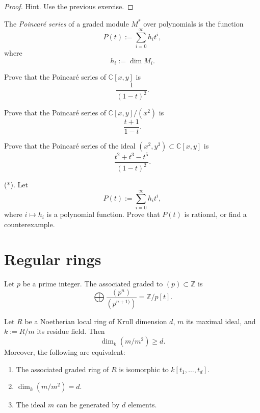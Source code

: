 \begin{proof}
Hint. Use the previous exercise.
\end{proof}

\begin{definition}
\label{definition-poincare-series}
The {\it Poincar\'e series} of a graded
module $M^\ast$ over polynomials is the
function
$$
P(t):=\sum_{i=0}^{\infty} h_i t^i,
$$
where
$$
h_i:=\dim M_i.
$$
\end{definition}

\begin{exercise}
\label{exercise-poincare-10-5}
Prove that the Poincar\'e series of
$\mathbb{C}[x,y]$ is
$$
\frac{1}{(1-t)^2}.
$$
\end{exercise}

\begin{exercise}
\label{exercise-poincare-10-6}
Prove that the Poincar\'e series of
$\mathbb{C}[x,y]/(x^2)$ is
$$
\frac{t+1}{1-t}.
$$
\end{exercise}

\begin{exercise}
\label{exercise-poincare-10-7}
Prove that the Poincar\'e series of the
ideal $(x^2,y^3)\subset \mathbb{C}[x,y]$ is
$$
\frac{t^2+t^3-t^5}{(1-t)^2}.
$$
\end{exercise}

\begin{exercise}
\label{exercise-poincare-10-8}
(*). Let
$$
P(t):=\sum_{i=0}^{\infty} h_i t^i,
$$
where $i\mapsto h_i$ is a polynomial
function.
Prove that $P(t)$ is rational, or find a
counterexample.
\end{exercise}

\section{Regular rings}
\label{section-regular-rings}

\noindent
Let $p$ be a prime integer.
The associated graded to $(p) \subset \mathbb{Z}$
is
$$
\bigoplus \frac{(p^n)}{(p^{n+1)})}
=
\mathbb{Z}/p[t].
$$


\begin{theorem}
\label{theorem-regular-rings}
Let $R$ be a Noetherian local ring of
Krull dimension $d$, $m$ its maximal ideal,
and $k:=R/m$ its residue field.
Then
$$
\dim_k(m/m^2)\geq d.
$$
Moreover, the following are equivalent:
\begin{enumerate}
\item The associated graded ring of $R$ is
isomorphic to $k[t_1,\dots,t_d]$.
\item $\dim_k(m/m^2)=d$.
\item The ideal $m$ can be generated by
$d$ elements.
\end{enumerate}
\end{theorem}


